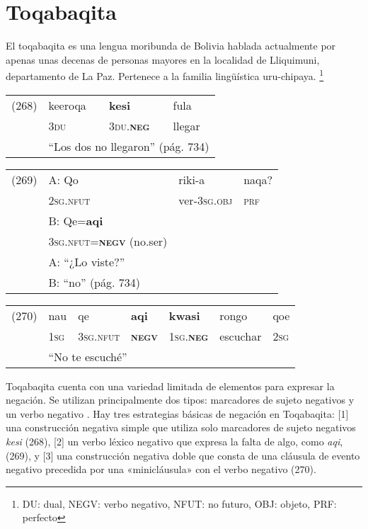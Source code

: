 \section*{Toqabaqita}

\noindent El toqabaqita es una lengua moribunda de Bolivia hablada actualmente por apenas unas decenas de personas mayores en la localidad de Lliquimuni, departamento de La Paz. Pertenece a la familia lingüística uru-chipaya.
\footnote{DU: dual, NEGV: verbo negativo, NFUT: no futuro, OBJ: objeto, PRF: perfecto}
\vspace{0.5cm}

{\setmainfont{Charis SIL} 

\begin{tabular}{llll}
(268) & keeroqa & \textbf{kesi} & fula \\
& \textsc{3du} & \textsc{3du.\textbf{neg}} & llegar \\
& \multicolumn{3}{l}{``Los dos no llegaron'' (pág. 734)}
\end{tabular} \vspace{0.5cm}

\begin{tabular}{llll}
(269) & A: Qo & riki-a & naqa? \\
& \textsc{2sg.nfut} & ver-\textsc{3sg.obj} & \textsc{prf} \\
& B: Qe=\textbf{aqi} \\
& \textsc{3sg.nfut=\textbf{negv}} (no.ser) \\
& \multicolumn{2}{l}{A: ``¿Lo viste?''} \\
& B: ``no'' (pág. 734)
\end{tabular} \vspace{0.5cm}

\begin{tabular}{lllllll}
(270) & nau & qe & \textbf{aqi} & \textbf{kwasi} & rongo & qoe \\
& \textsc{1sg} & \textsc{3sg.nfut} & \textsc{\textbf{negv}} & \textsc{1sg.\textbf{neg}} & escuchar & \textsc{2sg} \\
& \multicolumn{6}{l}{``No te escuché''}
\end{tabular} \vspace{0.5cm}

}

Toqabaqita cuenta con una variedad limitada de elementos para expresar la negación. Se utilizan principalmente dos tipos: marcadores de sujeto negativos y un verbo negativo \textcolor{MidnightBlue}{\citep{toqabaqita}}. Hay tres estrategias básicas de negación en Toqabaqita: [1] una construcción negativa simple que utiliza solo marcadores de sujeto negativos {\setmainfont{Charis SIL} \textit{kesi}} (268), [2] un verbo léxico negativo que expresa la falta de algo, como {\setmainfont{Charis SIL} \textit{aqi},} (269), y [3] una construcción negativa doble que consta de una cláusula de evento negativo precedida por una «minicláusula» con el verbo negativo (270). 